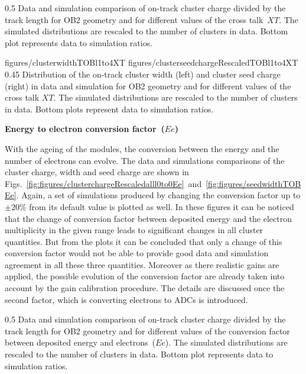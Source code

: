                  {0.5}       %
                 { Data and simulation comparison of on-track cluster charge divided by the track length for OB2 geometry and for different values of the cross talk~$XT$.  The simulated distributions are rescaled to the number of clusters in data.  Bottom plot represents data to simulation ratios. }

                 {figures/clusterwidthTOBl1to4XT}
                 {figures/clusterseedchargeRescaledTOBl1to4XT} %
                 {0.45}       %
                 { Distribution of the on-track cluster width (left) and cluster seed charge (right) in data and simulation for OB2 geometry and for different values of the cross talk $XT$.  The simulated distributions are rescaled to the number of clusters in data.  Bottom plots represent data to simulation ratios. }

\textbf{Energy to electron conversion factor~($Ee$)}

With the ageing of the modules, the conversion between the energy and the number of electrons can evolve. The data and simulations comparisons of the cluster charge, width and seed charge are shown in Figs.~\ref{fig:figures/clusterchargeRescaledalll0to0Ee}~and~\ref{fig:figures/seedwidthTOBEe}. Again, a set of simulations produced by changing the conversion factor up to $\pm 20\%$ from its default value is plotted as well. In these figures it can be noticed that the change of conversion factor between deposited energy and the electron multiplicity in the given range leads to significant changes in all cluster quantities. But from the plots it can be concluded that only a change of this conversion factor would not be able to provide good data and simulation agreement in all these three quantities. Moreover as there realistic gains are applied, the possible evolution of the conversion factor are already taken into account by the gain calibration procedure. The details are discussed once the second factor, which is converting electrons to ADCs is introduced.

                 {0.5}       %
                 { Data and simulation comparison of on-track cluster charge divided by the track length for OB2 geometry and for different values of the conversion factor between deposited energy and electrons~($Ee$). The simulated distributions are rescaled to the number of clusters in data.  Bottom plot represents data to simulation ratios. }

